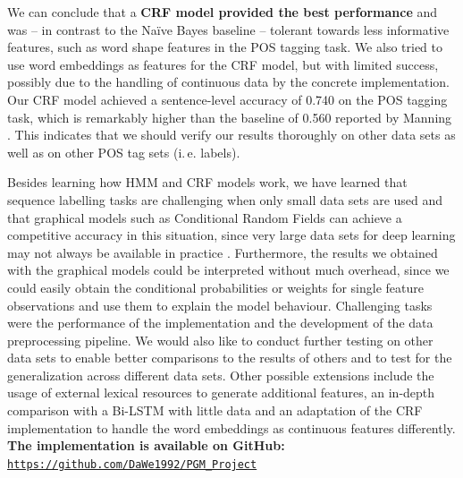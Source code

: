 \documentclass[twocolumns]{IEEEtran}
\begin{document}
We can conclude that a \textbf{CRF model provided the best performance} and was -- in contrast to the Na\"ive Bayes baseline -- tolerant towards less informative features, such as word shape features in the POS tagging task. We also tried to use word embeddings as features for the CRF model, but with limited success, possibly due to the handling of continuous data by the concrete implementation. %
Our CRF model achieved a sentence-level accuracy of 0.740 on the POS tagging task, which is remarkably higher than the baseline of 0.560 reported by Manning \cite{manningtimeforlingui}. This indicates that we should verify our results thoroughly on other data sets as well as on other POS tag sets (i.\,e. labels).

Besides learning how HMM and CRF models work, we have learned that sequence labelling tasks are challenging when only small data sets are used and that graphical models such as Conditional Random Fields can achieve a competitive accuracy in this situation, since very large data sets for deep learning may not always be available in practice \cite{nerlimiteddata} \cite{fewshotner}. Furthermore, the results we obtained with the graphical models could be interpreted without much overhead, since we could easily obtain the conditional probabilities or weights for single feature observations and use them to explain the model behaviour. Challenging tasks were the performance of the implementation and the development of the data preprocessing pipeline. We would also like to conduct further testing on other data sets to enable better comparisons to the results of others and to test for the generalization across different data sets. Other possible extensions include the usage of external lexical resources to generate additional features, an in-depth comparison with a Bi-LSTM with little data and an adaptation of the CRF implementation to handle the word embeddings as continuous features differently.\\ %

\vspace*{1mm}
\textbf{The implementation is available on GitHub:} \\
\colorbox{gray!30}{\texttt{\url{https://github.com/DaWe1992/PGM_Project}}}



\end{document}
